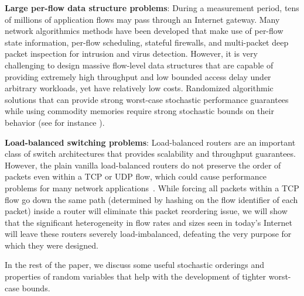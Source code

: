 \medskip
\noindent
\textbf{Large per-flow data structure problems}:
During a measurement period, tens of millions of application flows may pass through an Internet gateway. Many network algorithmics methods have been developed that make use of per-flow state information, \eg per-flow scheduling, stateful firewalls, and multi-packet deep packet inspection for intrusion and virus detection. However, it is very challenging to design massive flow-level data structures that are capable of providing extremely high throughput and low bounded access delay under arbitrary workloads, yet have relatively low costs. Randomized 
algorithmic solutions that can provide strong worst-case stochastic performance guarantees while using commodity memories
require strong stochastic bounds on their behavior (see for instance \cite{Hua08BRICK,Zhao09DRAM}).

\medskip
\noindent
\textbf{Load-balanced switching problems}:
Load-balanced routers are an important class of switch architectures that
provides scalability and throughput guarantees.  However, the plain vanilla 
load-balanced routers do not preserve the order of packets even within a TCP or UDP flow,
which could cause performance problems for many network applications~\cite{Chang02BvN1,Chang02BvN2}.
While forcing all packets within a TCP flow go down the same path (\eg determined by hashing on the flow identifier of each packet)
inside a router will eliminate this packet reordering issue, we will show that the significant heterogeneity in flow rates and sizes
seen in today's Internet will leave 
these routers severely load-imbalanced, defeating the very purpose for which they were designed.




In the rest of the paper, we
discuss some useful stochastic orderings and properties of random variables that help with the development
of tighter worst-case bounds. 

